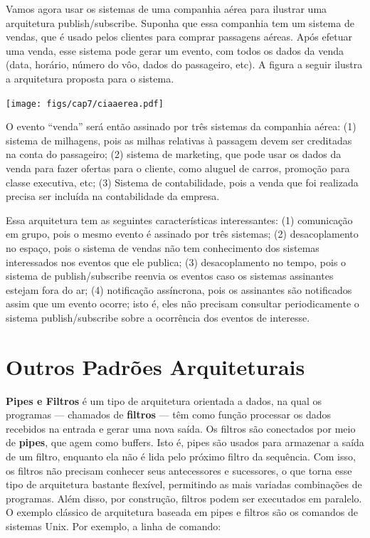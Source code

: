 \documentclass[
  11pt,
  twoside]{book}
\let\origfigure\figure
\let\endorigfigure\endfigure
\renewenvironment{figure}[1][2] {
    \expandafter\origfigure\expandafter[!h]
} {
    \endorigfigure
}
\begin{document}
Vamos agora usar os sistemas de uma companhia aérea para ilustrar uma
arquitetura publish/subscribe. Suponha que essa companhia tem um sistema
de vendas, que é usado pelos clientes para comprar passagens aéreas.
Após efetuar uma venda, esse sistema pode gerar um evento, com todos os
dados da venda (data, horário, número do vôo, dados do passageiro, etc).
A figura a seguir ilustra a arquitetura proposta para o sistema.

\begin{figure}
\centering
\texttt{[image: figs/cap7/ciaaerea.pdf]}
\caption{Arquitetura Pub/Sub em uma companhia aérea}
\end{figure}

O evento ``venda'' será então assinado por três sistemas da companhia
aérea: (1) sistema de milhagens, pois as milhas relativas à passagem
devem ser creditadas na conta do passageiro; (2) sistema de marketing,
que pode usar os dados da venda para fazer ofertas para o cliente, como
aluguel de carros, promoção para classe executiva, etc; (3) Sistema de
contabilidade, pois a venda que foi realizada precisa ser incluída na
contabilidade da empresa.

Essa arquitetura tem as seguintes características interessantes: (1)
comunicação em grupo, pois o mesmo evento é assinado por três sistemas;
(2) desacoplamento no espaço, pois o sistema de vendas não tem
conhecimento dos sistemas interessados nos eventos que ele publica; (3)
desacoplamento no tempo, pois o sistema de publish/subscribe reenvia os
eventos caso os sistemas assinantes estejam fora do ar; (4) notificação
assíncrona, pois os assinantes são notificados assim que um evento
ocorre; isto é, eles não precisam consultar periodicamente o sistema
publish/subscribe sobre a ocorrência dos eventos de interesse.

\hypertarget{outros-padruxf5es-arquiteturais}{%
\section{Outros Padrões
Arquiteturais}\label{outros-padruxf5es-arquiteturais}}

 

\textbf{Pipes e Filtros} é um tipo de arquitetura orientada a dados, na
qual os programas --- chamados de \textbf{filtros} --- têm como função
processar os dados recebidos na entrada e gerar uma nova saída. Os
filtros são conectados por meio de \textbf{pipes}, que agem como
buffers. Isto é, pipes são usados para armazenar a saída de um filtro,
enquanto ela não é lida pelo próximo filtro da sequência. Com isso, os
filtros não precisam conhecer seus antecessores e sucessores, o que
torna esse tipo de arquitetura bastante flexível, permitindo as mais
variadas combinações de programas. Além disso, por construção, filtros
podem ser executados em paralelo. O exemplo clássico de arquitetura
baseada em pipes e filtros são os comandos de sistemas Unix. Por
exemplo, a linha de comando:
\end{document}

